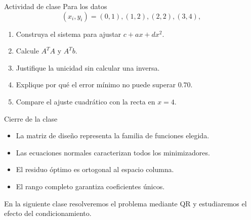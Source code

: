 \documentclass[aspectratio=169,12pt]{beamer}
\begin{document}
\begin{frame}{Actividad de clase}
Para los datos
\[
(x_i,y_i)=(0,1),(1,2),(2,2),(3,4),
\]
\begin{enumerate}
\item Construya el sistema para ajustar $c+ax+dx^2$.
\item Calcule $A^TA$ y $A^Tb$.
\item Justifique la unicidad sin calcular una inversa.
\item Explique por qué el error mínimo no puede superar $0.70$.
\item Compare el ajuste cuadrático con la recta en $x=4$.
\end{enumerate}
\end{frame}

\begin{frame}{Cierre de la clase}
\begin{itemize}
\item La matriz de diseño representa la familia de funciones elegida.
\item Las ecuaciones normales caracterizan todos los minimizadores.
\item El residuo óptimo es ortogonal al espacio columna.
\item El rango completo garantiza coeficientes únicos.
\end{itemize}
\vspace{.4cm}
En la siguiente clase resolveremos el problema mediante QR y estudiaremos
el efecto del condicionamiento.
\end{frame}
\end{document}
